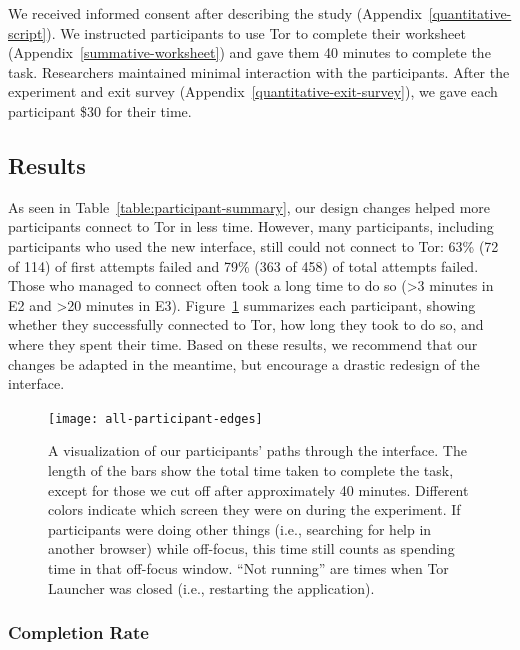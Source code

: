 \documentclass[USenglish,oneside,twocolumn]{article}
\begin{document}
We received informed consent after describing the study (Appendix~\ref{quantitative-script}). We instructed participants to use Tor to complete their worksheet (Appendix~\ref{summative-worksheet}) and gave them 40 minutes to complete the task. Researchers maintained minimal interaction with the participants. After the experiment and exit survey (Appendix~\ref{quantitative-exit-survey}), we gave each participant \$30 for their time.

\subsection{Results} 
As seen in Table~\ref{table:participant-summary}, our design changes helped more participants connect to Tor in less time. However, many participants, including participants who used the new interface, still could not connect to Tor: 63\% (72 of 114) of first attempts failed and 79\% (363 of 458) of total attempts failed. Those who managed to connect often took a long time to do so (>3 minutes in E2 and >20 minutes in E3). Figure~\ref{fig:all-participant-edges} summarizes each participant, showing whether they successfully connected to Tor, how long they took to do so, and where they spent their time. Based on these results, we recommend that our changes be adapted in the meantime, but encourage a drastic redesign of the interface.

\label{all-participant-edges} 
\begin{figure}
\centering
\texttt{[image: all-participant-edges]}
\caption{
A visualization of our participants' paths through the interface.
The length of the bars show the total time taken to complete the task,
except for those we cut off after approximately 40 minutes.
Different colors indicate which screen they were on during the experiment.
If participants were doing other things (i.e., searching for help in another browser)
while off-focus, this time still counts as spending time in that off-focus window. 
``Not running'' are times when Tor Launcher was closed (i.e., restarting the application).}
\label{fig:all-participant-edges}
\end{figure}

\subsubsection{Completion Rate} 
\end{document}
